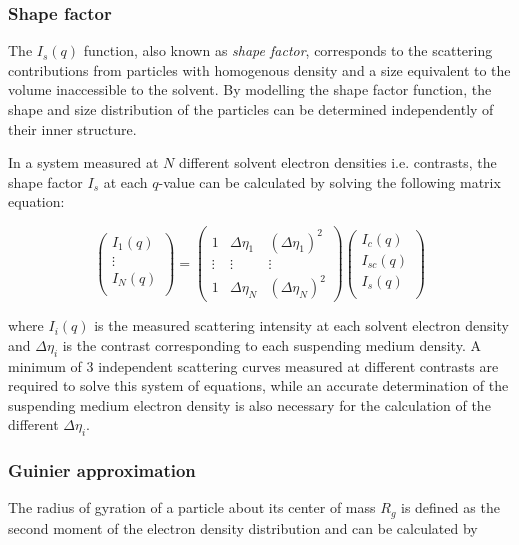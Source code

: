 \subsubsection{Shape factor}
The $I_s(q)$ function, also known as \emph{shape factor}, corresponds to the scattering contributions from particles with homogenous density and a size equivalent to the volume inaccessible to the solvent. By modelling the shape factor function, the shape and size distribution of the particles can be determined independently of their inner structure.

In a system measured at $N$ different solvent electron densities i.e. contrasts, the shape factor $I_s$ at each $q$-value can be calculated by solving the following matrix equation:

\begin{equation}
  \begin{pmatrix}
  I_1(q) \\
  \vdots \\
  I_N(q) \\
 \end{pmatrix}
  = 
 \begin{pmatrix}
  1 & \Delta \eta_1 &  \left( \Delta \eta_1 \right)^2 \\
  \vdots  & \vdots  & \vdots  \\
  1 & \Delta \eta_N &  \left( \Delta \eta_N \right)^2 
 \end{pmatrix}
 \begin{pmatrix}
  I_c(q) \\
  I_{sc}(q) \\
  I_s(q) \\
 \end{pmatrix}
\end{equation}

where $I_i (q)$ is the measured scattering intensity at each solvent electron density and $\Delta \eta _i$ is the contrast corresponding to each suspending medium density. A minimum of 3 independent scattering curves measured at different contrasts are required to solve this system of equations, while an accurate determination of the suspending medium electron density is also necessary for the calculation of the different $\Delta \eta _i$.

\subsubsection{Guinier approximation}
\label{sec:TheoryGuinier}

The radius of gyration of a particle about its center of mass $R_g$ is defined as the second moment of the electron density distribution and can be calculated by 

